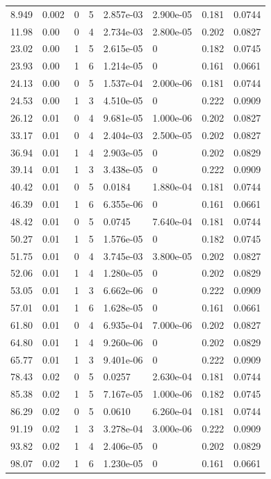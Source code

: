 \documentclass[preview]{standalone}
\begin{document}
{{\begin{tabular}{L{1.2cm}C{1.2cm} C{0.3cm}C{0.5cm} C{1.4cm}C{1.4cm} C{1.4cm}C{1.4cm}}
  8.949  &  0.002  & 0     &  5 &  2.857e-03  & 2.900e-05  & 0.181 &  0.0744   \\ 
  11.98  &  0.00  & 0     &  4 &  2.734e-03  & 2.800e-05  & 0.202 &  0.0827   \\ 
  23.02  &  0.00  & 1     &  5 &  2.615e-05  & 0  & 0.182 &  0.0745   \\ 
  23.93  &  0.00  & 1     &  6 &  1.214e-05  & 0  & 0.161 &  0.0661   \\ 
  24.13  &  0.00  & 0     &  5 &  1.537e-04  & 2.000e-06  & 0.181 &  0.0744   \\ 
  24.53  &  0.00  & 1     &  3 &  4.510e-05  & 0  & 0.222 &  0.0909   \\ 
  26.12  &  0.01  & 0     &  4 &  9.681e-05  & 1.000e-06  & 0.202 &  0.0827   \\ 
  33.17  &  0.01  & 0     &  4 &  2.404e-03  & 2.500e-05  & 0.202 &  0.0827   \\ 
  36.94  &  0.01  & 1     &  4 &  2.903e-05  & 0  & 0.202 &  0.0829   \\ 
  39.14  &  0.01  & 1     &  3 &  3.438e-05  & 0  & 0.222 &  0.0909   \\ 
  40.42  &  0.01  & 0     &  5 &  0.0184  & 1.880e-04  & 0.181 &  0.0744   \\ 
  46.39  &  0.01  & 1     &  6 &  6.355e-06  & 0  & 0.161 &  0.0661   \\ 
  48.42  &  0.01  & 0     &  5 &  0.0745  & 7.640e-04  & 0.181 &  0.0744   \\ 
  50.27  &  0.01  & 1     &  5 &  1.576e-05  & 0  & 0.182 &  0.0745   \\ 
  51.75  &  0.01  & 0     &  4 &  3.745e-03  & 3.800e-05  & 0.202 &  0.0827   \\ 
  52.06  &  0.01  & 1     &  4 &  1.280e-05  & 0  & 0.202 &  0.0829   \\ 
  53.05  &  0.01  & 1     &  3 &  6.662e-06  & 0  & 0.222 &  0.0909   \\ 
  57.01  &  0.01  & 1     &  6 &  1.628e-05  & 0  & 0.161 &  0.0661   \\ 
  61.80  &  0.01  & 0     &  4 &  6.935e-04  & 7.000e-06  & 0.202 &  0.0827   \\ 
  64.80  &  0.01  & 1     &  4 &  9.260e-06  & 0  & 0.202 &  0.0829   \\ 
  65.77  &  0.01  & 1     &  3 &  9.401e-06  & 0  & 0.222 &  0.0909   \\ 
  78.43  &  0.02  & 0     &  5 &  0.0257  & 2.630e-04  & 0.181 &  0.0744   \\ 
  85.38  &  0.02  & 1     &  5 &  7.167e-05  & 1.000e-06  & 0.182 &  0.0745   \\ 
  86.29  &  0.02  & 0     &  5 &  0.0610  & 6.260e-04  & 0.181 &  0.0744   \\ 
  91.19  &  0.02  & 1     &  3 &  3.278e-04  & 3.000e-06  & 0.222 &  0.0909   \\ 
  93.82  &  0.02  & 1     &  4 &  2.406e-05  & 0  & 0.202 &  0.0829   \\ 
  98.07  &  0.02  & 1     &  6 &  1.230e-05  & 0  & 0.161 &  0.0661   \\ 
\hline 
\end{tabular} 

}}
\end{document}
